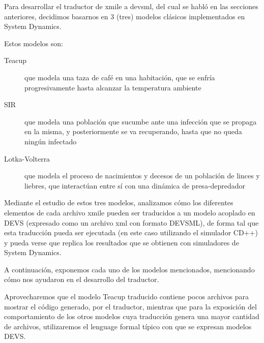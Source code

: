 Para desarrollar el traductor de xmile a devsml, del cual se habló en las secciones anteriores, decidimos basarnos en 3 (tres) modelos clásicos implementados en System Dynamics. 

Estos modelos son: 
\begin{description}
	\item[Teacup] que modela una taza de café en una habitación, que se enfría progresivamente hasta alcanzar la temperatura ambiente
	\item[SIR] 	que modela una población que sucumbe ante una infección que se propaga en la misma, y posteriormente se va recuperando, hasta que no queda ningún infectado
	\item[Lotka-Volterra] que modela el proceso de nacimientos y decesos de un población de linces y liebres, que interactúan entre sí con una dinámica de presa-depredador
\end{description}

Mediante el estudio de estos tres modelos, analizamos cómo los diferentes elementos de cada archivo xmile pueden ser traducidos a un modelo acoplado en DEVS (expresado como un archivo xml con formato DEVSML), de forma tal que esta traducción pueda ser ejecutada (en este caso utilizando el simulador CD++) y pueda verse que replica los resultados que se obtienen con simuladores de System Dynamics.

A continuación, exponemos cada uno de los modelos mencionados, mencionando cómo nos ayudaron en el desarrollo del traductor. 

Aprovecharemos que el modelo Teacup traducido contiene pocos archivos para mostrar el código generado, por el traductor, mientras que para la exposición del comportamiento de los otros modelos cuya traducción genera una mayor cantidad de archivos, utilizaremos el lenguage formal típico con que se expresan modelos DEVS.